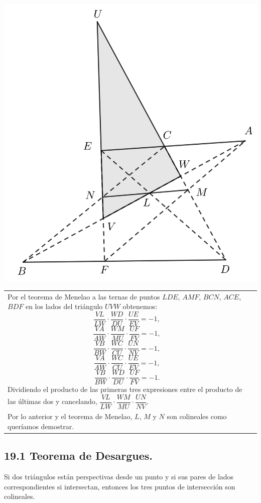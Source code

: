 \documentclass[12pt,a4paper]{article}
\begin{document}
\begin{center}
\includegraphics[scale=0.48]{pappus2.png} 
\end{center}
\newpage
\begin{tabular}{p{15.9 cm} p{1cm}}
Por el teorema de Menelao a las ternas de puntos $LDE$, $AMF$, $BCN$, $ACE$, $BDF$ en los lados del triángulo $UVW$ obtenemos:
$$\dfrac{VL}{LW}\cdot \dfrac{WD}{DU}\cdot \dfrac{UE}{EV}=-1,$$
$$\dfrac{VA}{AW}\cdot \dfrac{WM}{MU}\cdot \dfrac{UF}{FV}=-1,$$
$$\dfrac{VB}{BW}\cdot \dfrac{WC}{CU}\cdot \dfrac{UN}{NV}=-1,$$
$$\dfrac{VA}{AW}\cdot \dfrac{WC}{CU}\cdot \dfrac{UE}{EV}=-1,$$
$$\dfrac{VB}{BW}\cdot \dfrac{WD}{DU}\cdot \dfrac{UF}{FV}=-1.$$
Dividiendo el producto de las primeras tres expresiones entre el producto de las últimas dos y cancelando, $\dfrac{VL}{LW} \cdot \dfrac{WM}{MU} \cdot \dfrac{UN}{NV}.$
\\Por lo anterior y el teorema de Menelao, $L$, $M$ y $N$ son colineales como queríamos demostrar.

\end{tabular}
\subsection*{19.1 Teorema de Desargues.}
Si dos triángulos están perspectivas desde un punto y si sus pares de lados correspondientes si intersectan, entonces los tres puntos de intersección son colineales.
\end{document}
